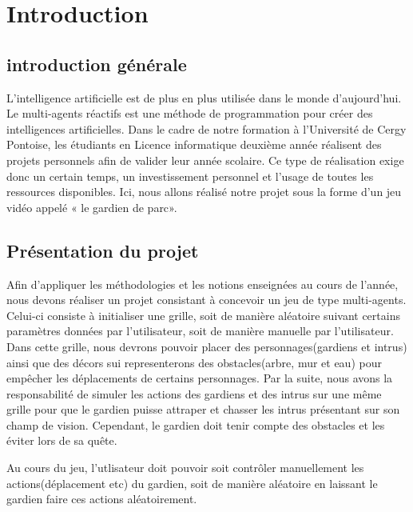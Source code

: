 \usepackage{graphicx}
\section{Introduction}


\subsection{introduction générale}
\vspace{10mm}
\paragraphe{}L’intelligence artificielle est de plus en plus utilisée dans le monde d’aujourd’hui. Le
multi-agents réactifs est une méthode de programmation pour créer des intelligences artificielles.
Dans le cadre de notre formation à l’Université de Cergy Pontoise, les étudiants en Licence
informatique deuxième année réalisent des projets personnels afin de valider leur année scolaire. Ce
type de réalisation exige donc un certain temps, un investissement personnel et l’usage de toutes les
ressources disponibles. Ici, nous allons réalisé notre projet sous la forme d’un jeu vidéo appelé « le
gardien de parc».
\vspace{10mm}

\subsection{Présentation du projet }

\paragraphe{}Afin d’appliquer les méthodologies et les notions enseignées au cours de l'année, nous devons réaliser un projet consistant à concevoir un jeu de type multi-agents. Celui-ci consiste à initialiser une grille, soit de manière aléatoire suivant certains paramètres données par l'utilisateur,  soit de manière manuelle par l'utilisateur. Dans cette grille, nous devrons pouvoir placer des personnages(gardiens et intrus) ainsi que des décors sui representerons des obstacles(arbre, mur et eau) pour empêcher les déplacements de certains personnages. Par la suite, nous avons la responsabilité de simuler les actions des gardiens et des intrus sur une même grille pour que le gardien puisse attraper et chasser les intrus présentant sur son champ de vision. Cependant, le gardien doit tenir compte des obstacles et les éviter lors de sa quête.

\vspace{10mm}
\paragraphe{}Au cours du jeu, l'utlisateur doit pouvoir soit contrôler manuellement les actions(déplacement etc) du gardien, soit de manière aléatoire en laissant le gardien faire  ces actions aléatoirement.

